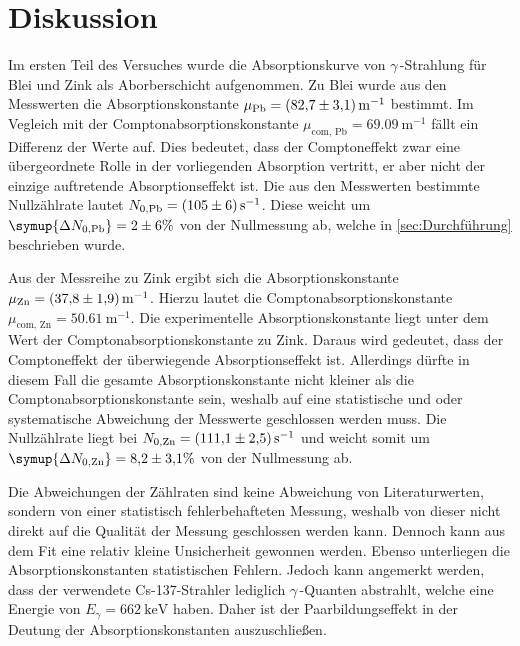 \section{Diskussion}
\label{sec:Diskussion}
Im ersten Teil des Versuches wurde die Absorptionskurve von $\gamma$\,-Strahlung für Blei und Zink als Aborberschicht aufgenommen.
Zu Blei wurde aus den Messwerten die Absorptionskonstante 
$\mu_\text{Pb} = \qty{82.7 +- 3.1}{\metre^{-1}}$ bestimmt. Im Vegleich mit der Comptonabsorptionskonstante $\mu_\text{com, Pb} = \qty{69.09}{\metre^{-1}}$ fällt ein Differenz der Werte auf.
Dies bedeutet, dass der Comptoneffekt zwar eine übergeordnete Rolle in der vorliegenden Absorption vertritt, er aber nicht der einzige auftretende Absorptionseffekt ist.
Die aus den Messwerten bestimmte Nullzählrate lautet $N_{0, \text{Pb}} = \qty{105 +- 6}{\second^{-1}}$. Diese weicht um $\symup{\Delta N_{0, \text{Pb}}} = \num{2 +- 6}\%$
von der Nullmessung ab, welche in \autoref{sec:Durchführung} beschrieben wurde.

Aus der Messreihe zu Zink ergibt sich die Absorptionskonstante $\mu_{\text{Zn}} = \qty{37.8 +- 1.9}{\metre^{-1}}$. Hierzu lautet die Comptonabsorptionskonstante 
$\mu_{\text{com, Zn}} = \qty{50.61}{\metre^{-1}}$. Die experimentelle Absorptionskonstante liegt unter dem Wert der Comptonabsorptionskonstante zu Zink. Daraus wird gedeutet, 
dass der Comptoneffekt der überwiegende Absorptionseffekt ist. Allerdings dürfte in diesem Fall die gesamte Absorptionskonstante nicht kleiner als die Comptonabsorptionskonstante 
sein, weshalb auf eine statistische und oder systematische Abweichung der Messwerte geschlossen werden muss. 
Die Nullzählrate liegt bei $N_{0, \text{Zn}} = \qty{111.1 +- 2.5}{\second^{-1}}$ und weicht somit um $\symup{\Delta N_{0, \text{Zn}}} = \num{8.2 +- 3.1}\%$ von der Nullmessung ab.

Die Abweichungen der Zählraten sind keine Abweichung von Literaturwerten, sondern von einer statistisch fehlerbehafteten Messung, weshalb von dieser nicht direkt auf die
Qualität der Messung geschlossen werden kann. Dennoch kann aus dem Fit eine relativ kleine Unsicherheit gewonnen werden. Ebenso unterliegen die Absorptionskonstanten 
statistischen Fehlern. Jedoch kann angemerkt werden, dass der verwendete Cs-137-Strahler lediglich $\gamma$\,-Quanten abstrahlt, welche eine Energie von 
$E_\gamma = \qty{662}{\kilo\electronvolt}$ \cite{physikalischesGrundpraktikum} haben. Daher ist der Paarbildungseffekt in der Deutung der Absorptionskonstanten auszuschließen.

